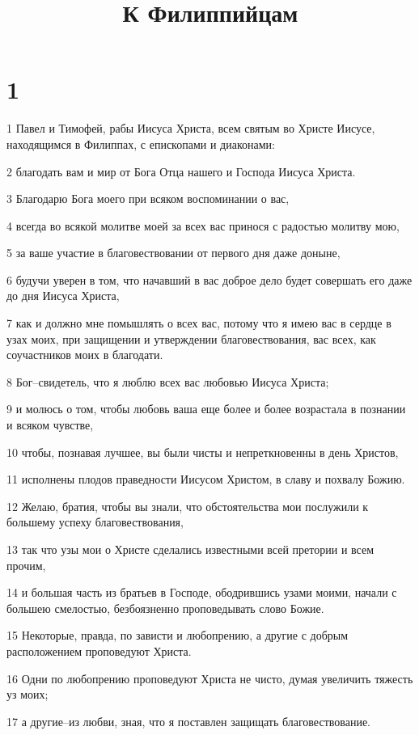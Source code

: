 

\title{К Филиппийцам}


\chapter{1}

\par 1 Павел и Тимофей, рабы Иисуса Христа, всем святым во Христе Иисусе, находящимся в Филиппах, с епископами и диаконами:
\par 2 благодать вам и мир от Бога Отца нашего и Господа Иисуса Христа.
\par 3 Благодарю Бога моего при всяком воспоминании о вас,
\par 4 всегда во всякой молитве моей за всех вас принося с радостью молитву мою,
\par 5 за ваше участие в благовествовании от первого дня даже доныне,
\par 6 будучи уверен в том, что начавший в вас доброе дело будет совершать его даже до дня Иисуса Христа,
\par 7 как и должно мне помышлять о всех вас, потому что я имею вас в сердце в узах моих, при защищении и утверждении благовествования, вас всех, как соучастников моих в благодати.
\par 8 Бог--свидетель, что я люблю всех вас любовью Иисуса Христа;
\par 9 и молюсь о том, чтобы любовь ваша еще более и более возрастала в познании и всяком чувстве,
\par 10 чтобы, познавая лучшее, вы были чисты и непреткновенны в день Христов,
\par 11 исполнены плодов праведности Иисусом Христом, в славу и похвалу Божию.
\par 12 Желаю, братия, чтобы вы знали, что обстоятельства мои послужили к большему успеху благовествования,
\par 13 так что узы мои о Христе сделались известными всей претории и всем прочим,
\par 14 и большая часть из братьев в Господе, ободрившись узами моими, начали с большею смелостью, безбоязненно проповедывать слово Божие.
\par 15 Некоторые, правда, по зависти и любопрению, а другие с добрым расположением проповедуют Христа.
\par 16 Одни по любопрению проповедуют Христа не чисто, думая увеличить тяжесть уз моих;
\par 17 а другие--из любви, зная, что я поставлен защищать благовествование.
